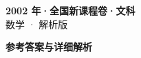 \documentclass[zihao=-4, a4paper]{ctexart}
\begin{document}
\begin{center}
  {\Large\bfseries 2002 年·全国新课程卷·文科}\\[4pt]
  {\large 数学 · 解析版}
\end{center}
\medskip
{}

\clearpage
{}
\begin{center}{\Large\bfseries 参考答案与详细解析}\end{center}
\medskip

\end{document}
